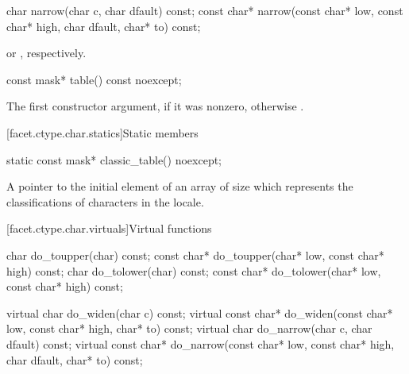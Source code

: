 %
\begin{itemdecl}
char        narrow(char c, char dfault) const;
const char* narrow(const char* low, const char* high, char dfault, char* to) const;
\end{itemdecl}

\begin{itemdescr}
\pnum
\returns
{}%
 or
%
,
respectively.
\end{itemdescr}

%
\begin{itemdecl}
const mask* table() const noexcept;
\end{itemdecl}

\begin{itemdescr}
\pnum
\returns
The first constructor argument, if it was nonzero,
otherwise .
\end{itemdescr}

[facet.ctype.char.statics]{Static members}

%
\begin{itemdecl}
static const mask* classic_table() noexcept;
\end{itemdecl}

\begin{itemdescr}
\pnum
\returns
A pointer to the initial element of an array of size 
which represents the classifications of characters in the  locale.
\end{itemdescr}

[facet.ctype.char.virtuals]{Virtual functions}

%
%
%
%
\begin{codeblock}
char        do_toupper(char) const;
const char* do_toupper(char* low, const char* high) const;
char        do_tolower(char) const;
const char* do_tolower(char* low, const char* high) const;

virtual char        do_widen(char c) const;
virtual const char* do_widen(const char* low, const char* high, char* to) const;
virtual char        do_narrow(char c, char dfault) const;
virtual const char* do_narrow(const char* low, const char* high,
                              char dfault, char* to) const;
\end{codeblock}

